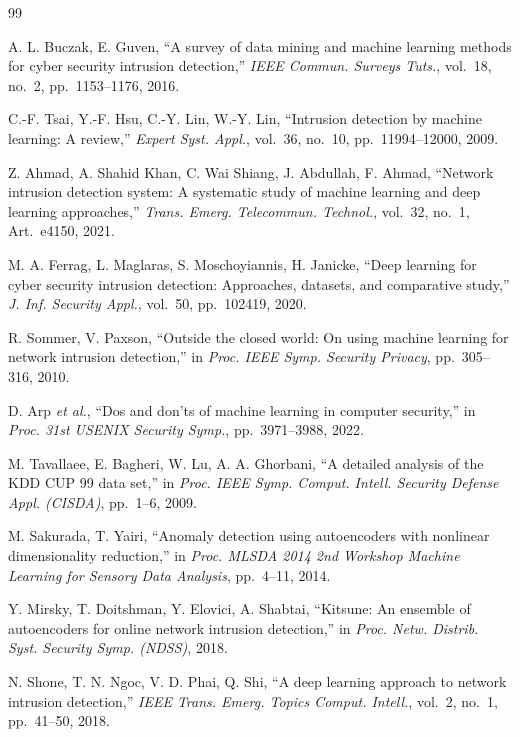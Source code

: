 \documentclass[journal]{IEEEtran}
\begin{document}
\begin{thebibliography}{99}

A. L. Buczak, E. Guven, ``A survey of data mining and machine learning methods for cyber security intrusion detection,'' \textit{IEEE Commun. Surveys Tuts.}, vol.~18, no.~2, pp.~1153--1176, 2016.

C.-F. Tsai, Y.-F. Hsu, C.-Y. Lin, W.-Y. Lin, ``Intrusion detection by machine learning: A review,'' \textit{Expert Syst. Appl.}, vol.~36, no.~10, pp.~11994--12000, 2009.

Z. Ahmad, A. Shahid Khan, C. Wai Shiang, J. Abdullah, F. Ahmad, ``Network intrusion detection system: A systematic study of machine learning and deep learning approaches,'' \textit{Trans. Emerg. Telecommun. Technol.}, vol.~32, no.~1, Art.~e4150, 2021.

M. A. Ferrag, L. Maglaras, S. Moschoyiannis, H. Janicke, ``Deep learning for cyber security intrusion detection: Approaches, datasets, and comparative study,'' \textit{J. Inf. Security Appl.}, vol.~50, pp.~102419, 2020.

R. Sommer, V. Paxson, ``Outside the closed world: On using machine learning for network intrusion detection,'' in \textit{Proc. IEEE Symp. Security Privacy}, pp.~305--316, 2010.

D. Arp \textit{et al.}, ``Dos and don'ts of machine learning in computer security,'' in \textit{Proc. 31st USENIX Security Symp.}, pp.~3971--3988, 2022.

M. Tavallaee, E. Bagheri, W. Lu, A. A. Ghorbani, ``A detailed analysis of the {KDD CUP} 99 data set,'' in \textit{Proc. IEEE Symp. Comput. Intell. Security Defense Appl. (CISDA)}, pp.~1--6, 2009.

M. Sakurada, T. Yairi, ``Anomaly detection using autoencoders with nonlinear dimensionality reduction,'' in \textit{Proc. MLSDA 2014 2nd Workshop Machine Learning for Sensory Data Analysis}, pp.~4--11, 2014.

Y. Mirsky, T. Doitshman, Y. Elovici, A. Shabtai, ``Kitsune: An ensemble of autoencoders for online network intrusion detection,'' in \textit{Proc. Netw. Distrib. Syst. Security Symp. (NDSS)}, 2018.

N. Shone, T. N. Ngoc, V. D. Phai, Q. Shi, ``A deep learning approach to network intrusion detection,'' \textit{IEEE Trans. Emerg. Topics Comput. Intell.}, vol.~2, no.~1, pp.~41--50, 2018.


\end{thebibliography}
\end{document}
